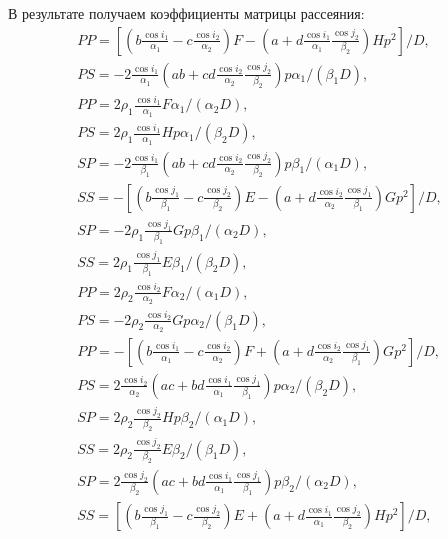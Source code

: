 В результате получаем коэффициенты матрицы рассеяния:
\begin{eqnarray}
PP = [ ( b\frac{\cos{i_1}}{\alpha_1} - c\frac{\cos{i_2}}{\alpha_2} )F - ( a + d\frac{\cos{i_1}}{\alpha_1}\frac{\cos{j_2}}{\beta_2} )Hp^2 ] / D, \\
PS = -2 \frac{\cos{i_1}}{\alpha_1} (ab + cd \frac{\cos{i_2}}{\alpha_2} \frac{\cos{j_2}}{\beta_2} ) p \alpha_1 / (\beta_1 D), \\
PP = 2 \rho_1 \frac{\cos{i_1}}{\alpha_1} F \alpha_1 / (\alpha_2 D), \\
PS = 2 \rho_1 \frac{\cos{i_1}}{\alpha_1} H p \alpha_1 / (\beta_2 D), \\
SP = -2 \frac{\cos{i_1}}{\beta_1} (ab + cd \frac{\cos{i_2}}{\alpha_2} \frac{\cos{j_2}}{\beta_2} ) p \beta_1 / (\alpha_1 D), \\
SS = - [ ( b\frac{\cos{j_1}}{\beta_1} - c\frac{\cos{j_2}}{\beta_2} )E - ( a + d\frac{\cos{i_2}}{\alpha_2}\frac{\cos{j_1}}{\beta_1} )Gp^2 ] / D, \\
SP = - 2 \rho_1 \frac{\cos{j_1}}{\beta_1} Gp \beta_1 / (\alpha_2 D), \\
SS = 2 \rho_1 \frac{\cos{j_1}}{\beta_1} E \beta_1 / (\beta_2 D), \\
PP = 2 \rho_2 \frac{\cos{i_2}}{\alpha_2} F \alpha_2 / (\alpha_1 D), \\
PS = - 2 \rho_2 \frac{\cos{i_2}}{\alpha_2} Gp \alpha_2 / (\beta_1 D), \\
PP = - [ ( b\frac{\cos{i_1}}{\alpha_1} - c\frac{\cos{i_2}}{\alpha_2} )F + ( a + d\frac{\cos{i_2}}{\alpha_2}\frac{\cos{j_1}}{\beta_1} )Gp^2 ] / D, \\
PS = 2 \frac{\cos{i_2}}{\alpha_2} (ac + bd \frac{\cos{i_1}}{\alpha_1} \frac{\cos{j_1}}{\beta_1} ) p \alpha_2 / (\beta_2 D), \\
SP = 2 \rho_2 \frac{\cos{j_2}}{\beta_2} Hp \beta_2 / (\alpha_1 D), \\
SS = 2 \rho_2 \frac{\cos{j_2}}{\beta_2} E \beta_2 / (\beta_1 D), \\
SP = 2 \frac{\cos{j_2}}{\beta_2} (ac + bd \frac{\cos{i_1}}{\alpha_1} \frac{\cos{j_1}}{\beta_1} ) p \beta_2 / (\alpha_2 D), \\
SS = [ ( b\frac{\cos{j_1}}{\beta_1} - c\frac{\cos{j_2}}{\beta_2} )E + ( a + d\frac{\cos{i_1}}{\alpha_1}\frac{\cos{j_2}}{\beta_2} )Hp^2 ] / D,
\end{eqnarray}

